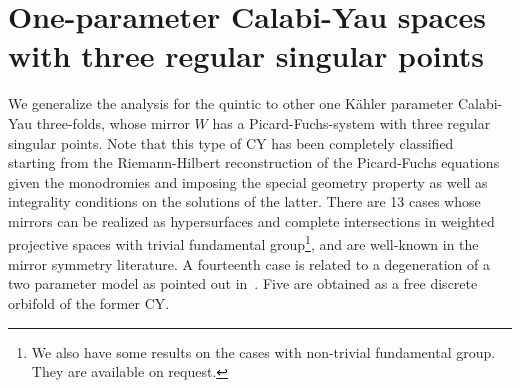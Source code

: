 \documentclass[12pt]{article}
\begin{document}
\section{One-parameter Calabi-Yau spaces with three regular singular points}
We  generalize the analysis for the quintic to other one K\"ahler
parameter Calabi-Yau three-folds, whose mirror $W$ has a
Picard-Fuchs-system with three regular singular points. Note that
this type of CY has been completely classified~\cite{DoranMorgan}
starting from the Riemann-Hilbert reconstruction of the
Picard-Fuchs equations given the monodromies and imposing the
special geometry property as well as integrality conditions on the
solutions of the latter. There are 13 cases whose mirrors can be
realized as hypersurfaces and complete intersections in weighted
projective spaces with trivial fundamental group\footnote{We also 
have some results on the cases with non-trivial fundamental group. 
They are available on request.}, and are well-known
in the mirror symmetry literature. A fourteenth case is
related to a degeneration of a two parameter model as pointed out
in~\cite{KKRS}. Five are obtained as a free discrete orbifold of
the former CY.
\end{document}
